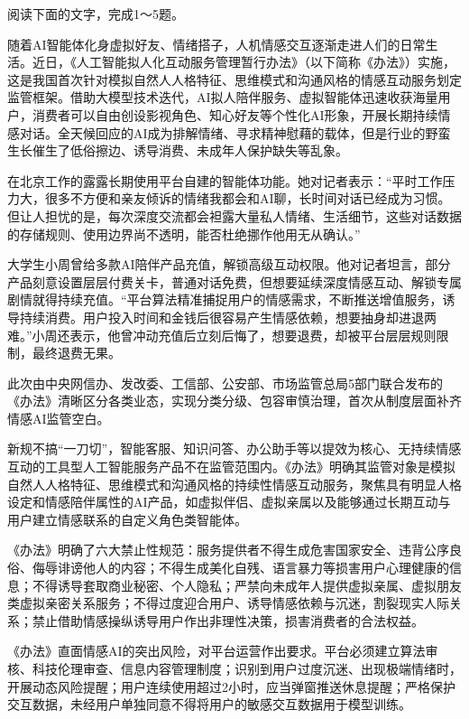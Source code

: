 \documentclass[11pt,a4paper]{ctexart}
\begin{document}


阅读下面的文字，完成1～5题。

\begin{materialtext}
随着AI智能体化身虚拟好友、情绪搭子，人机情感交互逐渐走进人们的日常生活。近日，《人工智能拟人化互动服务管理暂行办法》（以下简称《办法》）实施，这是我国首次针对模拟自然人人格特征、思维模式和沟通风格的情感互动服务划定监管框架。借助大模型技术迭代，AI拟人陪伴服务、虚拟智能体迅速收获海量用户，消费者可以自由创设影视角色、知心好友等个性化AI形象，开展长期持续情感对话。全天候回应的AI成为排解情绪、寻求精神慰藉的载体，但是行业的野蛮生长催生了低俗擦边、诱导消费、未成年人保护缺失等乱象。

在北京工作的露露长期使用平台自建的智能体功能。她对记者表示：“平时工作压力大，很多不方便和亲友倾诉的情绪我都会和AI聊，长时间对话已经成为习惯。但让人担忧的是，每次深度交流都会袒露大量私人情绪、生活细节，这些对话数据的存储规则、使用边界尚不透明，能否杜绝挪作他用无从确认。”

大学生小周曾给多款AI陪伴产品充值，解锁高级互动权限。他对记者坦言，部分产品刻意设置层层付费关卡，普通对话免费，但想要延续深度情感互动、解锁专属剧情就得持续充值。“平台算法精准捕捉用户的情感需求，不断推送增值服务，诱导持续消费。用户投入时间和金钱后很容易产生情感依赖，想要抽身却进退两难。”小周还表示，他曾冲动充值后立刻后悔了，想要退费，却被平台层层规则限制，最终退费无果。

此次由中央网信办、发改委、工信部、公安部、市场监管总局5部门联合发布的《办法》清晰区分各类业态，实现分类分级、包容审慎治理，首次从制度层面补齐情感AI监管空白。

新规不搞“一刀切”，智能客服、知识问答、办公助手等以提效为核心、无持续情感互动的工具型人工智能服务产品不在监管范围内。《办法》明确其监管对象是模拟自然人人格特征、思维模式和沟通风格的持续性情感互动服务，聚焦具有明显人格设定和情感陪伴属性的AI产品，如虚拟伴侣、虚拟亲属以及能够通过长期互动与用户建立情感联系的自定义角色类智能体。

《办法》明确了六大禁止性规范：服务提供者不得生成危害国家安全、违背公序良俗、侮辱诽谤他人的内容；不得生成美化自残、语言暴力等损害用户心理健康的信息；不得诱导套取商业秘密、个人隐私；严禁向未成年人提供虚拟亲属、虚拟朋友类虚拟亲密关系服务；不得过度迎合用户、诱导情感依赖与沉迷，割裂现实人际关系；禁止借助情感操纵诱导用户作出非理性决策，损害消费者的合法权益。

《办法》直面情感AI的突出风险，对平台运营作出要求。平台必须建立算法审核、科技伦理审查、信息内容管理制度；识别到用户过度沉迷、出现极端情绪时，开展动态风险提醒；用户连续使用超过2小时，应当弹窗推送休息提醒；严格保护交互数据，未经用户单独同意不得将用户的敏感交互数据用于模型训练。


\end{materialtext}
\end{document}
